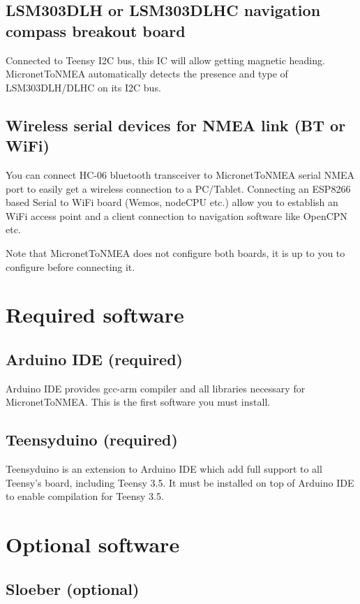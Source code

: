 \documentclass{report}
\begin{document}
\subsection{LSM303DLH or LSM303DLHC navigation compass breakout board}

Connected to Teensy I2C bus, this IC will allow getting magnetic heading. MicronetToNMEA automatically detects the presence and type of LSM303DLH/DLHC on its I2C bus.

\subsection{Wireless serial devices for NMEA link (BT or WiFi)}

You can connect HC-06 bluetooth transceiver to MicronetToNMEA serial NMEA port to easily get a wireless connection to a PC/Tablet. Connecting an ESP8266 based Serial to WiFi board (Wemos, nodeCPU etc.) allow you to establish an WiFi access point and a client connection to navigation software like OpenCPN etc.

Note that MicronetToNMEA does not configure both boards, it is up to you to configure before connecting it.

\section{Required software}

\subsection{Arduino IDE (required)}
Arduino IDE provides gcc-arm compiler and all libraries necessary for MicronetToNMEA. This is the first software you must install.

\subsection{Teensyduino (required)}

Teensyduino is an extension to Arduino IDE which add full support to all Teensy’s board, including Teensy 3.5. It must be installed on top of Arduino IDE to enable compilation for Teensy 3.5.

\section{Optional software}

\subsection{Sloeber (optional)}
\end{document}
